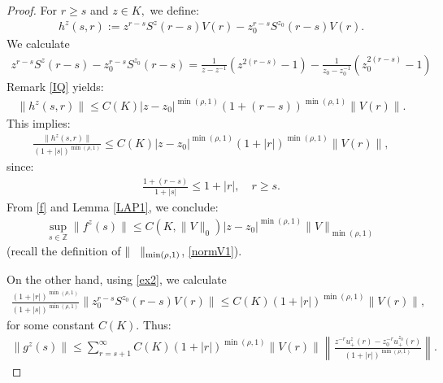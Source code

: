 \documentclass[12pt,oneside,onecolumn,open]{article}
\begin{document}
\begin{proof}
    For $r \geq s$ and  $ z \in K , $  
    we define:
    \begin{align}
        h^{z}(s,r) := z^{r-s} S^{z}(r-s) V(r) - z_{0}^{r-s} S^{z_{0}}(r-s) V(r).
    \end{align}
    We calculate 
\begin{align}
    z^{r-s} S^{z}(r-s) - z_{0}^{r-s} S^{z_{0}}(r-s) = \frac{1}{z - z^{-1}}  (z^{2 (r-s)} - 1 ) - \frac{1}{z_0 - z_0^{-1}}  (z_0^{2 (r-s)} - 1 ) 
    \end{align}
Remark \ref{IQ} yields:
   \begin{align}
        \| h^{z}(s,r) \| \leq C(K) |z - z_{0}|^{\min(\rho, 1)} (1 + (r-s))^{\min(\rho, 1)} \| V(r) \|.
    \end{align}
    This
     implies:
    \begin{align}
        \frac{\| h^{z}(s,r) \|}{(1+|s|)^{\min(\rho, 1 )}} \leq C(K ) |z - z_{0}|^{\min(\rho, 1)} (1 + |r|)^{\min(\rho, 1 )} \| V(r) \|,
    \end{align}
    since:
    \begin{align}
        \frac{1 + (r-s)}{1 + |s|} \leq 1 + |r|, \quad r \geq s.
    \end{align}
    From \eqref{f} and Lemma \ref{LAP1}, we conclude:
    \begin{align}\label{d}
        \sup_{s \in \mathbb{Z}} \| f^{z}(s) \| \leq C(K, \| V \|_0 ) |z - z_0|^{\min(\rho, 1 )} \| V \|_{\min(\rho, 1 )}
    \end{align}  (recall the definition of $\|\hspace{0.3cm}\|_{\min(\rho, 1)}$, \eqref{normV1}).
    
    On the other hand, using \eqref{ex2},  we calculate
    \begin{align}
        \frac{(1+|r|)^{\min(\rho, 1 )}}{(1+|s|)^{\min(\rho, 1 )}} \| z_{0}^{r-s} S^{z_{0}}(r-s) V(r) \| \leq C(K) (1 + |r|)^{\min(\rho, 1 )} \| V(r) \|,
    \end{align}
    for some constant $C(K)$. Thus:
    \begin{align}\label{e}
        \| g^{z}(s) \| \leq  \sum_{r=s+1}^{\infty} C(K)(1 + |r|)^{\min(\rho, 1 )} \| V(r) \| \left\| \frac{z^{-r} u_{+}^{z}(r) - z_{0}^{-r} u_{+}^{z_{0}}(r)}{(1+|r|)^{\min(\rho, 1 )}} \right\|.
    \end{align}
    

\end{proof}
\end{document}
